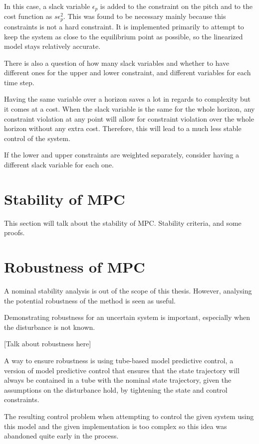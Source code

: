In this case, a slack variable $\epsilon_p$ is added to the constraint on the pitch and to the cost function as $s \epsilon_p^2$. This was found to be necessary mainly because this constraints is not a hard constraint. It is implemented primarily to attempt to keep the system as close to the equilibrium point as possible, so the linearized model stays relatively accurate.

There is also a question of how many slack variables and whether to have different ones for the upper and lower constraint, and different variables for each time step. 



Having the same variable over a horizon saves a lot in regards to complexity but it comes at a cost. When the slack variable is the same for the whole horizon, any constraint violation at any point will allow for constraint violation over the whole horizon without any extra cost. Therefore, this will lead to a much less stable control of the system. 

If the lower and upper constraints are weighted separately, consider having a different slack variable for each one. 


\section{Stability of MPC}


This section will talk about the stability of MPC. Stability criteria, and some proofs.

\section{Robustness of MPC}
A nominal stability analysis is out of the scope of this thesis. However, analysing the potential robustness of the method is seen as useful.

Demonstrating robustness for an uncertain system is important, especially when the disturbance is not known. 

[Talk about robustness here]



A way to ensure robustness is using tube-based model predictive control, a version of model predictive control that ensures that the state trajectory will always be contained in a tube with the nominal state trajectory, given the assumptions on the disturbance hold, by tightening the state and control constraints. 

The resulting control problem when attempting to control the given system using this model and the given implementation is too complex so this idea was abandoned quite early in the process.

